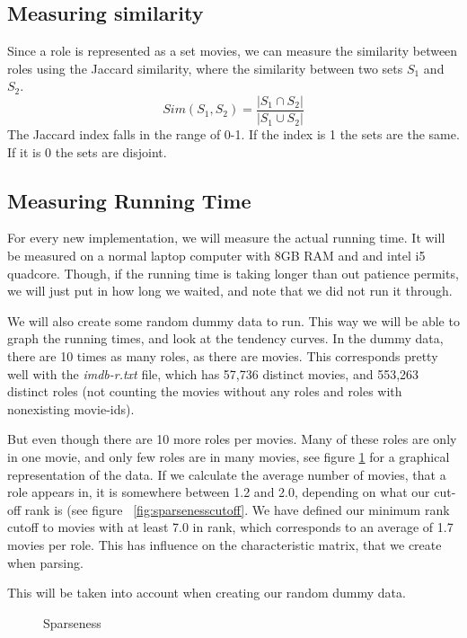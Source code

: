 \documentclass[a4paper,11pt]{article}
\begin{document}
\subsection{Measuring similarity}
Since a role is represented as a set movies, we can measure the similarity between roles using the Jaccard similarity, where the similarity between two sets $S_1$ and $S_2$.
\begin{equation}
Sim(S_1, S_2) = \frac{|S_1 \cap S_2|}{|S_1 \cup S_2|}
\end{equation}
The Jaccard index falls in the range of 0-1. If the index is 1 the sets are the same. If it is 0 the sets are disjoint.


\subsection{Measuring Running Time}
For every new implementation, we will measure the actual running time. It will be measured on a normal laptop computer with 8GB RAM and and intel i5 quadcore. Though, if the running time is taking longer than out patience permits, we will just put in how long we waited, and note that we did not run it through.

We will also create some random dummy data to run. This way we will be able to graph the running times, and look at the tendency curves. In the dummy data, there are 10 times as many roles, as there are movies. This corresponds pretty well with the \emph{imdb-r.txt} file, which has 57,736 distinct movies, and 553,263 distinct roles (not counting the movies without any roles and roles with nonexisting movie-ids).

But even though there are 10 more roles per movies. Many of these roles are only in one movie, and only few roles are in many movies, see figure \ref{fig:sparseness} for a graphical representation of the data. If we calculate the average number of movies, that a role appears in, it is somewhere between 1.2 and 2.0, depending on what our cut-off rank is (see figure ~\ref{fig:sparsenesscutoff}. We have defined our minimum rank cutoff to movies with at least 7.0 in rank, which corresponds to an average of 1.7 movies per role. This has influence on the characteristic matrix, that we create when parsing.

This will be taken into account when creating our random dummy data.

\begin{figure}
    \begin{center}
        \caption{Sparseness}
        \label{fig:sparseness}
    \end{center}
\end{figure}
\end{document}
